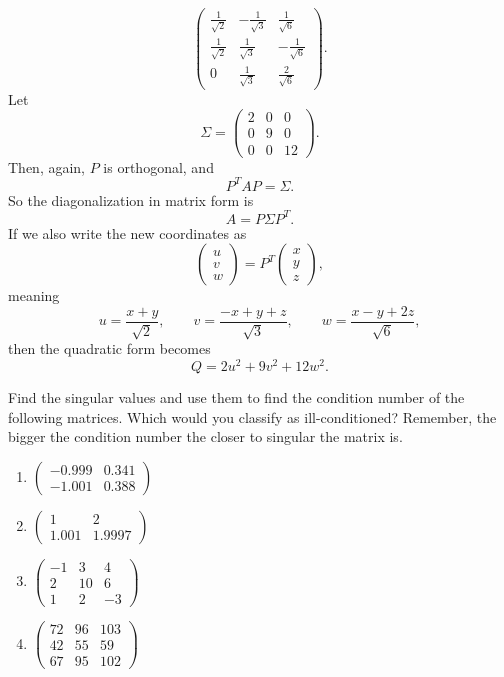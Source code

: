 \documentclass[10pt]{extarticle}
\begin{document}
\begin{enumerate}[label=(\alph*)]
\[\begin{pmatrix}
\frac{1}{\sqrt{2}} & -\frac{1}{\sqrt{3}} & \frac{1}{\sqrt{6}}\\[0.6em]
\frac{1}{\sqrt{2}} & \frac{1}{\sqrt{3}} & -\frac{1}{\sqrt{6}}\\[0.6em]
0 & \frac{1}{\sqrt{3}} & \frac{2}{\sqrt{6}}
\end{pmatrix}.
\]
Let
\[
\Sigma=
\begin{pmatrix}
2 & 0 & 0\\
0 & 9 & 0\\
0 & 0 & 12
\end{pmatrix}.
\]
Then, again, $P$ is orthogonal, and
\[
P^TAP=\Sigma.
\]
So the diagonalization in matrix form is
\[
\boxed{A=P\Sigma P^T.}
\]
If we also write the new coordinates as
\[
\begin{pmatrix}
u\\v\\w
\end{pmatrix}
=
P^T
\begin{pmatrix}
x\\y\\z
\end{pmatrix},
\]
meaning
\[
u=\frac{x+y}{\sqrt{2}},
\qquad
v=\frac{-x+y+z}{\sqrt{3}},
\qquad
w=\frac{x-y+2z}{\sqrt{6}},
\]
then the quadratic form becomes
\[
Q=2u^2+9v^2+12w^2.
\]
\end{enumerate}

\newpage

\begin{problem}[Problem 5]
Find the singular values and use them to find the condition number of the following matrices. Which would you classify as ill-conditioned? Remember, the bigger the condition number the closer to singular the matrix is.
\begin{enumerate}[label=(\alph*)]
\item $\begin{pmatrix}-0.999 & 0.341\\-1.001 & 0.388\end{pmatrix}$
\item $\begin{pmatrix}1 & 2\\1.001 & 1.9997\end{pmatrix}$
\item $\begin{pmatrix}-1 & 3 & 4\\2 & 10 & 6\\1 & 2 & -3\end{pmatrix}$
\item $\begin{pmatrix}72 & 96 & 103\\42 & 55 & 59\\67 & 95 & 102\end{pmatrix}$
\end{enumerate}
\end{problem}
\end{document}
